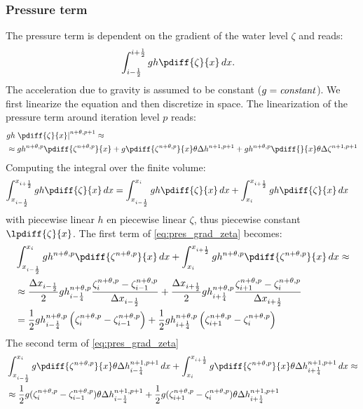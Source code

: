 \subsubsection{Pressure term} \label{sec:pressure_dependent_on_zeta}
The pressure term is dependent on the gradient of the water level $\zeta$ and reads:
\begin{align}
    & \int_{i-\half}^{i+\half} gh\pdiff{\zeta}{x} \,dx.
\end{align}
The acceleration due to gravity is assumed to be constant ($g={\it{constant}}$).
We first linearize the equation and then discretize in space.
The linearization of the pressure term around iteration level $p$ reads:
\begin{align}
    & g h \left. \pdiff{\zeta}{x} \right|^{n+\theta,p+1}  \approx
    \\
    & \approx g h^{n+\theta,p} \pdiff{\zeta^{n+\theta,p}}{x} +
    g \pdiff{\zeta^{n+\theta,p}}{x} \theta\Delta h^{n+1, p+1} +
    g h^{n+\theta,p} \pdiff{}{x} \theta\Delta \zeta^{n+1, p+1} \label{eq:pres_grad_zeta}
\end{align}
Computing the integral over the finite volume:
\begin{align}
    \int_{x_{i-\half}}^{x_{i+\half}} gh\pdiff{\zeta}{x} \,dx & = \int_{x_{i-\half}}^{x_{i}} gh\pdiff{\zeta}{x} \,dx +
    \int_{x_{i}}^{x_{i+\half}} gh\pdiff{\zeta}{x} \,dx
    \label{eq:pres_grad_zeta_fv}
\end{align}
with piecewise linear $h$ en piecewise linear $\zeta$, thus piecewise constant $\lpdiff{\zeta}{x}$.
The first term of \autoref{eq:pres_grad_zeta} becomes:
\begin{align}
    & \int_{x_{i-\half}}^{x_{i}} g h^{n+\theta,p} \pdiff{\zeta^{n+\theta,p}}{x} \,dx +
    \int_{x_{i}}^{x_{i+\half}} g h^{n+\theta,p} \pdiff{\zeta^{n+\theta,p}}{x} \,dx \approx
    \nonumber \\*
    & \approx \frac{\Dx_{i-\half}}{2}  g  h^{n+\theta,p}_{i-\quart} \frac{\zeta^{n+\theta,p}_i- \zeta^{n+\theta,p}_{i-1}}{\Dx_{i-\half}} +
    \frac{\Dx_{i+\half}}{2} g h^{n+\theta,p}_{i+\quart} \frac{\zeta^{n+\theta,p}_{i+1} - \zeta^{n+\theta,p}_{i}}{\Dx_{i+\half}}
    \\
    & = \half g h^{n+\theta,p}_{i-\quart} \left(\zeta^{n+\theta,p}_i- \zeta^{n+\theta,p}_{i-1}\right)
    +
    \half g h^{n+\theta,p}_{i+\quart} \left(\zeta^{n+\theta,p}_{i+1} - \zeta^{n+\theta,p}_{i}\right)
\end{align}
The second term of \autoref{eq:pres_grad_zeta}
\begin{align}
    & \int_{x_{i-\half}}^{x_{i}} g \pdiff{\zeta^{n+\theta,p}}{x} \theta \Delta h^{n+1, p+1}_{i-\quart} \, dx +
    \int_{x_{i}}^{x_{i+\half}} g \pdiff{\zeta^{n+\theta,p}}{x} \theta \Delta h^{n+1, p+1}_{i+\quart} \,dx \approx
    \\
    & \approx
     \half  g  (\zeta^{n+\theta,p}_{i}- \zeta^{n+\theta,p}_{i-1}) \theta\Delta h^{n+1, p+1}_{i-\quart} +
     \half g (\zeta^{n+\theta,p}_{i+1} - \zeta^{n+\theta,p}_{i}) \theta\Delta h^{n+1, p+1}_{i+\quart}
\end{align}
